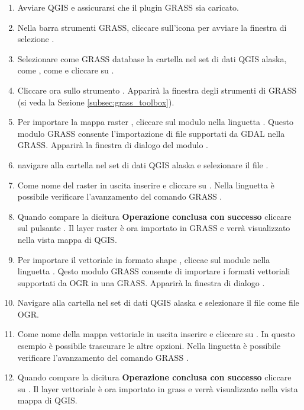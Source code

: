 \begin{enumerate}
  \item Avviare QGIS e assicurarsi che il plugin GRASS sia caricato.
  \item Nella barra strumenti GRASS, cliccare sull'icona
   per avviare la finestra di
  selezione .
  \item Selezionare come GRASS database la cartella  nel
  set di dati QGIS alaska, come , come
    e cliccare su .
  \item Cliccare ora sullo strumento . Apparirà la finestra degli strumenti di GRASS (si veda la Sezione
  \ref{subsec:grass_toolbox}).
  \item Per importare la mappa raster , cliccare sul
  modulo  nella linguetta . Questo
  modulo GRASS consente l'importazione di file supportati da GDAL nella
   GRASS. Apparirà la finestra di dialogo del modulo
  .
  \item navigare alla cartella  nel set
  di dati QGIS alaska e selezionare il file .
  \item Come nome del raster in uscita inserire  e
  cliccare su . Nella linguetta  è possibile
  verificare l'avanzamento del comando GRASS .
  \item Quando compare la dicitura \textbf{Operazione conclusa con successo}
  cliccare sul pulsante . Il layer raster
   è ora importato in GRASS e verrà visualizzato
  nella vista mappa di QGIS.
  \item Per importare il vettoriale in formato shape ,
  cliccae sul module  nella linguetta .
  Qesto modulo GRASS consente di importare i formati vettoriali supportati da
  OGR in una  GRASS. Apparirà la finestra di dialogo .
  \item Navigare alla cartella  nel set di dati
  QGIS alaska e selezionare il file  come file OGR.
  \item Come nome della mappa vettoriale in uscita inserire
   e cliccare su . In questo esempio è
  possibile trascurare le altre opzioni. Nella linguetta  è
  possibile verificare l'avanzamento del comando GRASS .
  \item Quando compare la dicitura \textbf{Operazione conclusa con successo}
  cliccare su . Il layer vettoriale
   è ora importato in grass e verrà visualizzato nella
  vista mappa di QGIS. 
\end{enumerate}


